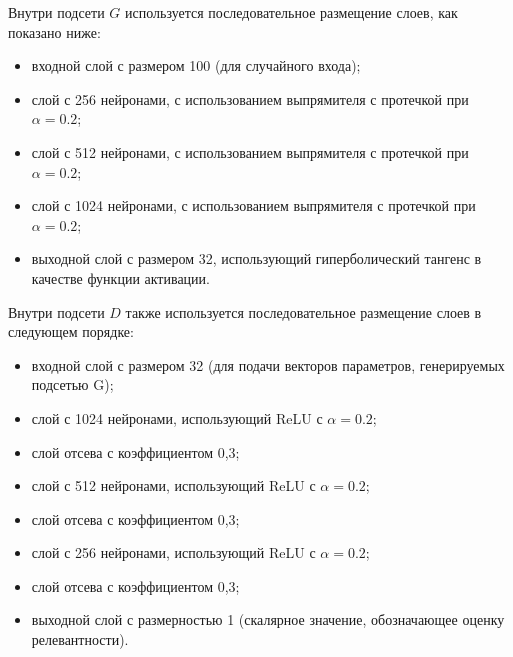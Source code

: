 Внутри подсети $G$ используется последовательное размещение слоев, как показано ниже:
\begin{itemize}
    \item входной слой с размером 100 (для случайного
    входа);
    \item слой с 256 нейронами, с использованием выпрямителя с протечкой при $\alpha = 0.2$;
    \item слой с 512 нейронами, с использованием выпрямителя с протечкой при $\alpha = 0.2$;
    \item слой с 1024 нейронами, с использованием выпрямителя с протечкой при $\alpha = 0.2$;
    \item выходной слой с размером 32, использующий гиперболический тангенс в качестве функции активации.
\end{itemize}
Внутри подсети $D$ также используется последовательное размещение слоев в следующем порядке:
\begin{itemize}
    \item входной слой с размером 32 (для подачи векторов параметров, генерируемых подсетью G);
    \item слой с 1024 нейронами, использующий ReLU с $\alpha = 0.2$;
    \item слой отсева с коэффициентом 0,3;
    \item слой с 512 нейронами, использующий ReLU с $\alpha = 0.2$;
    \item слой отсева с коэффициентом 0,3;
    \item слой с 256 нейронами, использующий ReLU с $\alpha = 0.2$;
    \item слой отсева с коэффициентом 0,3;
    \item выходной слой с размерностью 1 (скалярное значение, обозначающее оценку релевантности).
\end{itemize}

